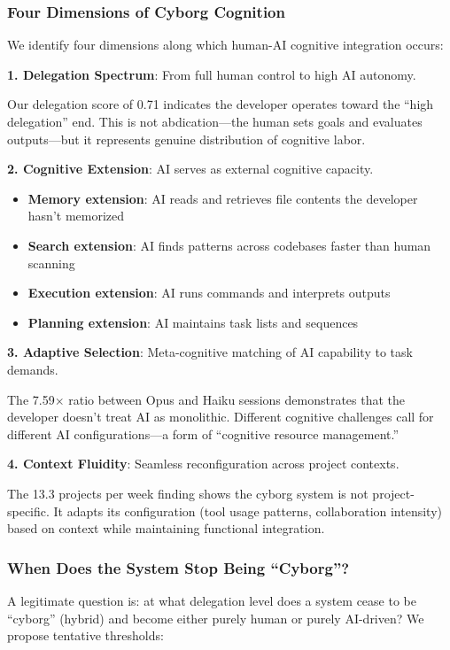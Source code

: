 \subsubsection{Four Dimensions of Cyborg Cognition}

We identify four dimensions along which human-AI cognitive integration occurs:

\textbf{1. Delegation Spectrum}: From full human control to high AI autonomy.

Our delegation score of 0.71 indicates the developer operates toward the ``high delegation'' end. This is not abdication---the human sets goals and evaluates outputs---but it represents genuine distribution of cognitive labor.

\textbf{2. Cognitive Extension}: AI serves as external cognitive capacity.

\begin{itemize}
    \item \textbf{Memory extension}: AI reads and retrieves file contents the developer hasn't memorized
    \item \textbf{Search extension}: AI finds patterns across codebases faster than human scanning
    \item \textbf{Execution extension}: AI runs commands and interprets outputs
    \item \textbf{Planning extension}: AI maintains task lists and sequences
\end{itemize}

\textbf{3. Adaptive Selection}: Meta-cognitive matching of AI capability to task demands.

The 7.59$\times$ ratio between Opus and Haiku sessions demonstrates that the developer doesn't treat AI as monolithic. Different cognitive challenges call for different AI configurations---a form of ``cognitive resource management.''

\textbf{4. Context Fluidity}: Seamless reconfiguration across project contexts.

The 13.3 projects per week finding shows the cyborg system is not project-specific. It adapts its configuration (tool usage patterns, collaboration intensity) based on context while maintaining functional integration.

\subsubsection{When Does the System Stop Being ``Cyborg''?}

A legitimate question is: at what delegation level does a system cease to be ``cyborg'' (hybrid) and become either purely human or purely AI-driven? We propose tentative thresholds:

